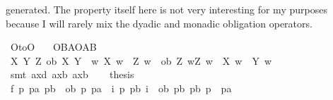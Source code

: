 \begin{isabellebody}
\begin{isamarkuptext}
generated. The property itself here is not very interesting for my purposes because I will rarely mix the dyadic
and monadic obligation operators.%
\end{isamarkuptext}\isamarkuptrue%
\isamarkupfalse%
\ O{\isacharunderscore}to{\isacharunderscore}O{\isacharcolon}\isanewline
\ \ \ {\isachardoublequoteopen}{\isasymTurnstile}{\isacharparenleft}O{\isacharbraceleft}B{\isacharbar}A{\isacharbraceright}\isactrlbold {\isasymrightarrow}O{\isacharbraceleft}{\isacharparenleft}A\isactrlbold {\isasymrightarrow}B{\isacharparenright}{\isacharbar}\isactrlbold {\isasymtop}{\isacharbraceright}{\isacharparenright}{\isachardoublequoteclose}\isanewline
%
\isadelimproof
%
\endisadelimproof
%
\isatagproof
{}\isamarkupfalse%
{\isacharminus}\isanewline
\ \ \isamarkupfalse%
\ {\isachardoublequoteopen}{\isasymforall}X\ Y\ Z{\isachardot}\ {\isacharparenleft}ob\ X\ Y\ {\isasymand}\ {\isacharparenleft}{\isasymforall}w{\isachardot}\ X\ w\ {\isasymlongrightarrow}\ Z\ w{\isacharparenright}{\isacharparenright}\ {\isasymlongrightarrow}\ ob\ Z\ {\isacharparenleft}{\isasymlambda}w{\isachardot}{\isacharparenleft}Z\ w\ {\isasymand}\ {\isasymnot}X\ w{\isacharparenright}\ {\isasymor}\ Y\ w{\isacharparenright}{\isachardoublequoteclose}\isanewline
%
\isanewline
\ \ \ \ \isamarkupfalse%
\ {\isacharparenleft}smt\ ax{\isacharunderscore}{}d\ ax{\isacharunderscore}{}b\ ax{\isacharunderscore}{}b{\isacharprime}{\isacharprime}{\isacharparenright}\isanewline
%
\isanewline
\ \ \isamarkupfalse%
\ {\isacharquery}thesis\isanewline
\ \ \isamarkupfalse%
\ {\isacharminus}\isanewline
\ \ \ \ \isamarkupfalse%
\ f{}{\isacharcolon}\ {\isachardoublequoteopen}{\isasymforall}p\ pa\ pb{\isachardot}\ {\isacharparenleft}{\isacharparenleft}{\isasymnot}\ {\isacharparenleft}ob\ p\ pa{\isacharparenright}{\isacharparenright}\ {\isasymor}\ {\isacharparenleft}{\isasymexists}i{\isachardot}\ {\isacharparenleft}p\isactrlbold {\isasymand}{\isacharparenleft}\isactrlbold {\isasymnot}\ pb{\isacharparenright}{\isacharparenright}\ i{\isacharparenright}{\isacharparenright}\ {\isasymor}\ {\isacharparenleft}ob\ pb\ {\isacharparenleft}{\isacharparenleft}pb\isactrlbold {\isasymand}{\isacharparenleft}\isactrlbold {\isasymnot}\ p{\isacharparenright}{\isacharparenright}\isactrlbold {\isasymor}\ \ pa{\isacharparenright}{\isacharparenright}{\isachardoublequoteclose}\isanewline

\end{isabellebody}
